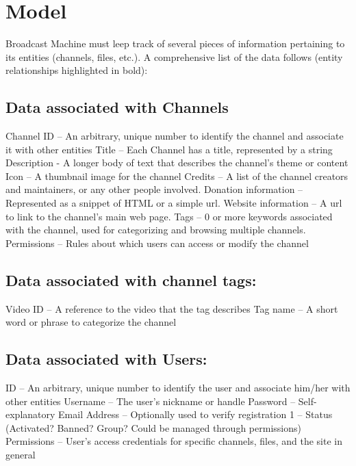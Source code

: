 \documentclass[a4paper,12pt]{report}
\begin{document}
\section{Model}
Broadcast Machine must leep track of  several pieces of information pertaining to its entities (channels, files, etc.). A comprehensive list of the data follows (entity relationships highlighted in bold):

\subsection{Data associated with Channels}
Channel ID – An arbitrary, unique number to identify the channel and associate it 		with other entities
Title – Each Channel has a title, represented by a string
Description - A longer body of text that describes the channel's theme or content
Icon – A thumbnail image for the channel
Credits – A list of the channel creators and maintainers, or any other people 	involved. 
Donation information – Represented as a snippet of HTML or a simple url.
Website information – A url to link to the channel's main web page.
Tags – 0 or more keywords associated with the channel, used for categorizing and 	browsing multiple channels.
Permissions – Rules about which users can access or modify the channel

\subsection{Data associated with channel tags:}
	Video ID – A reference to the video that the tag describes
	Tag name – A short word or phrase to categorize the channel

\subsection{Data associated with Users:}
	ID – An arbitrary, unique number to identify the user and associate him/her with 		other entities
	Username – The user's nickname or handle
	Password – Self-explanatory
	Email Address – Optionally used to verify registration
	1 – Status (Activated? Banned? Group? Could be managed through permissions)
	Permissions – User's access credentials for specific channels, files, and the site in 	general
\end{document}

